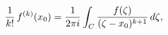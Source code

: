 \[\frac{1}{k!}\,f^{(k)}(x_{0})=\frac{1}{2\pi i}\int_{C}\frac{f(\zeta)}{(\zeta-x_%
{0})^{k+1}}\,d\zeta,\]